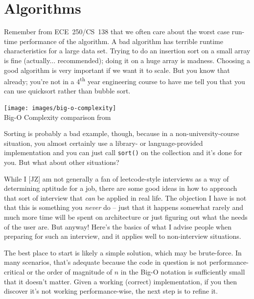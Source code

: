 




\section*{Algorithms}
Remember from ECE~250/CS~138 that we often care about the worst case run-time performance of the algorithm. A bad algorithm has terrible runtime characteristics for a large data set. Trying to do an insertion sort on a small array is fine (actually... recommended); doing it on a huge array is madness. Choosing a good algorithm is very important if we want it to scale.  But you know that already; you're not in a 4\textsuperscript{th} year engineering course to have me tell you that you can use quicksort rather than bubble sort.

\begin{center}
	\texttt{[image: images/big-o-complexity]}\\
	Big-O Complexity comparison from ~\cite{bigocheatsheet}
\end{center}

Sorting is probably a bad example, though, because in a non-university-course situation, you almost certainly use a library- or language-provided implementation and you can just call \texttt{sort()} on the collection and it's done for you. But what about other situations?

While I [JZ] am not generally a fan of leetcode-style interviews as a way of determining aptitude for a job, there are some good ideas in how to approach that sort of interview that \textit{can} be applied in real life. The objection I have is not that this is something you \textit{never} do -- just that it happens somewhat rarely and much more time will be spent on architecture or just figuring out what the needs of the user are. But anyway! Here's the basics of what I advise people when preparing for such an interview, and it applies well to non-interview situations.

The best place to start is likely a simple solution, which may be brute-force. In many scenarios, that's adequate because the code in question is not performance-critical or the order of magnitude of $n$ in the Big-O notation is sufficiently small that it doesn't matter. Given a working (correct) implementation, if you then discover it's not working performance-wise, the next step is to refine it. 

